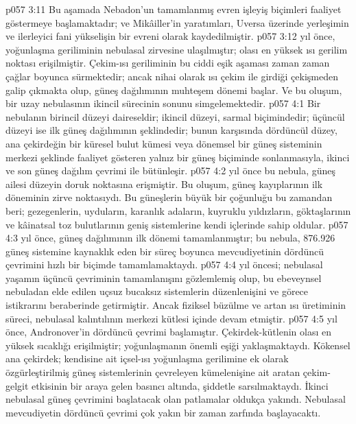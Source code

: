 \vs p057 3:11 Bu aşamada Nebadon’un tamamlanmış evren işleyiş biçimleri faaliyet göstermeye başlamaktadır; ve Mikâiller’in yaratımları, Uversa üzerinde yerleşimin ve ilerleyici fani yükselişin bir evreni olarak kaydedilmiştir.
\vs p057 3:12  yıl önce, yoğunlaşma geriliminin nebulasal zirvesine ulaşılmıştır; olası en yüksek ısı gerilim noktası erişilmiştir. Çekim\hyp{}ısı geriliminin bu ciddi eşik aşaması zaman zaman çağlar boyunca sürmektedir; ancak nihai olarak ısı çekim ile girdiği çekişmeden galip çıkmakta olup, güneş dağılımının muhteşem dönemi başlar. Ve bu oluşum, bir uzay nebulasının ikincil sürecinin sonunu simgelemektedir.
\vs p057 4:1 Bir nebulanın birincil düzeyi daireseldir; ikincil düzeyi, sarmal biçimindedir; üçüncül düzeyi ise ilk güneş dağılımının şeklindedir; bunun karşısında dördüncül düzey, ana çekirdeğin bir küresel bulut kümesi veya dönemsel bir güneş sisteminin merkezi şeklinde faaliyet gösteren yalnız bir güneş biçiminde sonlanmasıyla, ikinci ve son güneş dağılım çevrimi ile bütünleşir.
\vs p057 4:2  yıl önce bu nebula, güneş ailesi düzeyin doruk noktasına erişmiştir. Bu oluşum, güneş kayıplarının ilk döneminin zirve noktasıydı. Bu güneşlerin büyük bir çoğunluğu bu zamandan beri; gezegenlerin, uyduların, karanlık adaların, kuyruklu yıldızların, göktaşlarının ve kâinatsal toz bulutlarının geniş sistemlerine kendi içlerinde sahip oldular.
\vs p057 4:3  yıl önce, güneş dağılımının ilk dönemi tamamlanmıştır; bu nebula, 876.926 güneş sistemine kaynaklık eden bir süreç boyunca mevcudiyetinin dördüncü çevrimini hızlı bir biçimde tamamlamaktaydı.
\vs p057 4:4  yıl öncesi; nebulasal yaşamın üçüncü çevriminin tamamlanışını gözlemlemiş olup, bu ebeveynsel nebuladan elde edilen uçsuz bucaksız sistemlerin düzenlenişini ve görece istikrarını beraberinde getirmiştir. Ancak fiziksel büzülme ve artan ısı üretiminin süreci, nebulasal kalıntılının merkezi kütlesi içinde devam etmiştir.
\vs p057 4:5  yıl önce, Andronover’in dördüncü çevrimi başlamıştır. Çekirdek\hyp{}kütlenin olası en yüksek sıcaklığı erişilmiştir; yoğunlaşmanın önemli eşiği yaklaşmaktaydı. Kökensel ana çekirdek; kendisine ait içsel\hyp{}ısı yoğunlaşma gerilimine ek olarak özgürleştirilmiş güneş sistemlerinin çevreleyen kümelenişine ait aratan çekim\hyp{}gelgit etkisinin bir araya gelen basıncı altında, şiddetle sarsılmaktaydı. İkinci nebulasal güneş çevrimini başlatacak olan patlamalar oldukça yakındı. Nebulasal mevcudiyetin dördüncü çevrimi çok yakın bir zaman zarfında başlayacaktı.
